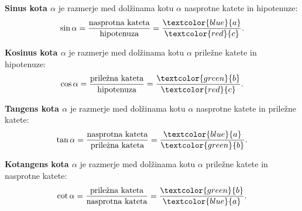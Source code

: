 \begin{figure}[H]
                        \end{figure}
                    

                    \begin{multicols}{2}
                        \textbf{Sinus kota $\alpha$} je razmerje med dolžinama kotu $\alpha$ nasprotne katete in hipotenuze: 
                        $$\sin\alpha = \dfrac{\textrm{nasprotna kateta}}{\textrm{hipotenuza}}=\dfrac{\textcolor{blue}{a}}{\textcolor{red}{c}}.$$

                        
                        \textbf{Kosinus kota $\alpha$} je razmerje med dolžinama kotu $\alpha$ priležne katete in hipotenuze: 
                        $$\cos\alpha = \frac{\textrm{priležna kateta}}{\textrm{hipotenuza}}=\dfrac{\textcolor{green}{b}}{\textcolor{red}{c}}.$$
            
                    
                        \textbf{Tangens kota $\alpha$} je razmerje med dolžinama kotu $\alpha$ nasprotne katete in priležne katete: 
                        $$\tan\alpha = \frac{\textrm{nasprotna kateta}}{\textrm{priležna kateta}}=\dfrac{\textcolor{blue}{a}}{\textcolor{green}{b}}.$$
                    
                    
                        \textbf{Kotangens kota $\alpha$} je razmerje med dolžinama kotu $\alpha$ priležne katete in nasprotne katete: 
                        $$\cot\alpha = \frac{\textrm{priležna kateta}}{\textrm{nasprotna kateta}}=\dfrac{\textcolor{green}{b}}{\textcolor{blue}{a}}.$$

                    \end{multicols}
                    
